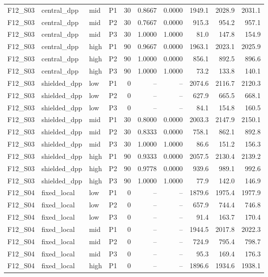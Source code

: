 \begin{longtable}{llllrrrrrr}
F12\_S03 & central\_dpp & mid & P1 & 30 & 0.8667 & 0.0000 & 1949.1 & 2028.9 & 2031.1 \\
F12\_S03 & central\_dpp & mid & P2 & 30 & 0.7667 & 0.0000 & 915.3 & 954.2 & 957.1 \\
F12\_S03 & central\_dpp & mid & P3 & 30 & 1.0000 & 1.0000 & 81.0 & 147.8 & 154.9 \\
F12\_S03 & central\_dpp & high & P1 & 90 & 0.9667 & 0.0000 & 1963.1 & 2023.1 & 2025.9 \\
F12\_S03 & central\_dpp & high & P2 & 90 & 1.0000 & 0.0000 & 856.1 & 892.5 & 896.6 \\
F12\_S03 & central\_dpp & high & P3 & 90 & 1.0000 & 1.0000 & 73.2 & 133.8 & 140.1 \\
F12\_S03 & shielded\_dpp & low & P1 & 0 & -- & -- & 2074.6 & 2116.7 & 2120.3 \\
F12\_S03 & shielded\_dpp & low & P2 & 0 & -- & -- & 627.9 & 665.5 & 668.1 \\
F12\_S03 & shielded\_dpp & low & P3 & 0 & -- & -- & 84.1 & 154.8 & 160.5 \\
F12\_S03 & shielded\_dpp & mid & P1 & 30 & 0.8000 & 0.0000 & 2003.3 & 2147.9 & 2150.1 \\
F12\_S03 & shielded\_dpp & mid & P2 & 30 & 0.8333 & 0.0000 & 758.1 & 862.1 & 892.8 \\
F12\_S03 & shielded\_dpp & mid & P3 & 30 & 1.0000 & 1.0000 & 86.6 & 151.2 & 156.3 \\
F12\_S03 & shielded\_dpp & high & P1 & 90 & 0.9333 & 0.0000 & 2057.5 & 2130.4 & 2139.2 \\
F12\_S03 & shielded\_dpp & high & P2 & 90 & 0.9778 & 0.0000 & 939.6 & 989.1 & 992.6 \\
F12\_S03 & shielded\_dpp & high & P3 & 90 & 1.0000 & 1.0000 & 77.9 & 142.0 & 146.9 \\
F12\_S04 & fixed\_local & low & P1 & 0 & -- & -- & 1879.6 & 1975.4 & 1977.9 \\
F12\_S04 & fixed\_local & low & P2 & 0 & -- & -- & 657.9 & 744.4 & 746.8 \\
F12\_S04 & fixed\_local & low & P3 & 0 & -- & -- & 91.4 & 163.7 & 170.4 \\
F12\_S04 & fixed\_local & mid & P1 & 0 & -- & -- & 1944.5 & 2017.8 & 2022.3 \\
F12\_S04 & fixed\_local & mid & P2 & 0 & -- & -- & 724.9 & 795.4 & 798.7 \\
F12\_S04 & fixed\_local & mid & P3 & 0 & -- & -- & 95.3 & 169.4 & 176.3 \\
F12\_S04 & fixed\_local & high & P1 & 0 & -- & -- & 1896.6 & 1934.6 & 1938.1 \\

\end{longtable}
